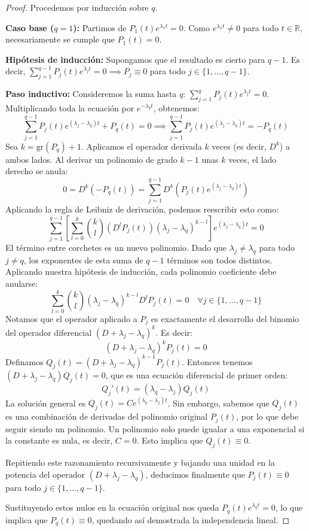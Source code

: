 \begin{proof}
Procedemos por inducción sobre $q$.
 
 \textbf{Caso base ($q=1$):}
 Partimos de $P_1(t) e^{\lambda_1 t} = 0$. Como $e^{\lambda_1 t} \neq 0$ para todo $t \in \mathbb{R}$, necesariamente se cumple que $P_1(t) = 0$.

 \textbf{Hipótesis de inducción:}
 Supongamos que el resultado es cierto para $q-1$. Es decir, $\sum_{j=1}^{q-1} P_j(t) e^{\lambda_j t} = 0 \implies P_j \equiv 0$ para todo $j \in \{1, \dots, q-1\}$.

 \textbf{Paso inductivo:}
 Consideremos la suma hasta $q$: $\sum_{j=1}^q P_j(t) e^{\lambda_j t} = 0$. Multiplicando toda la ecuación por $e^{-\lambda_q t}$, obtenemos:
 \[
 \sum_{j=1}^{q-1} P_j(t) e^{(\lambda_j - \lambda_q) t} + P_q(t) = 0 \implies \sum_{j=1}^{q-1} P_j(t) e^{(\lambda_j - \lambda_q) t} = -P_q(t)
 \]
 Sea $k = \text{gr}(P_q) + 1$. Aplicamos el operador derivada $k$ veces (es decir, $D^k$) a ambos lados. Al derivar un polinomio de grado $k-1$ unas $k$ veces, el lado derecho se anula:
 \[
 0 = D^k (-P_q(t)) = \sum_{j=1}^{q-1} D^k \left( P_j(t) e^{(\lambda_j - \lambda_q) t} \right)
 \]
 Aplicando la regla de Leibniz de derivación, podemos reescribir esto como:
 \[
 \sum_{j=1}^{q-1} \left[ \sum_{l=0}^k \binom{k}{l} (D^l P_j(t)) (\lambda_j - \lambda_q)^{k-l} \right] e^{(\lambda_j - \lambda_q) t} = 0
 \]
 El término entre corchetes es un nuevo polinomio. Dado que $\lambda_j \neq \lambda_q$ para todo $j \neq q$, los exponentes de esta suma de $q-1$ términos son todos distintos. Aplicando nuestra hipótesis de inducción, cada polinomio coeficiente debe anularse:
 \[
 \sum_{l=0}^k \binom{k}{l} (\lambda_j - \lambda_q)^{k-l} D^l P_j(t) = 0 \quad \forall j \in \{1, \dots, q-1\}
 \]
 Notamos que el operador aplicado a $P_j$ es exactamente el desarrollo del binomio del operador diferencial $(D + \lambda_j - \lambda_q)^k$. Es decir:
 \[
 (D + \lambda_j - \lambda_q)^k P_j(t) = 0
 \]
 Definamos $Q_j(t) = (D + \lambda_j - \lambda_q)^{k-1} P_j(t)$. Entonces tenemos $(D + \lambda_j - \lambda_q) Q_j(t) = 0$, que es una ecuación diferencial de primer orden:
 \[
 Q_j'(t) = (\lambda_q - \lambda_j) Q_j(t)
 \]
 La solución general es $Q_j(t) = C e^{(\lambda_q - \lambda_j) t}$. Sin embargo, sabemos que $Q_j(t)$ es una combinación de derivadas del polinomio original $P_j(t)$, por lo que debe seguir siendo un polinomio. Un polinomio solo puede igualar a una exponencial si la constante es nula, es decir, $C = 0$. Esto implica que $Q_j(t) \equiv 0$.

 Repitiendo este razonamiento recursivamente y bajando una unidad en la potencia del operador $(D + \lambda_j - \lambda_q)$, deducimos finalmente que $P_j(t) \equiv 0$ para todo $j \in \{1, \dots, q-1\}$.
 
 Sustituyendo estos nulos en la ecuación original nos queda $P_q(t) e^{\lambda_q t} = 0$, lo que implica que $P_q(t) \equiv 0$, quedando así demostrada la independencia lineal.
\end{proof}

